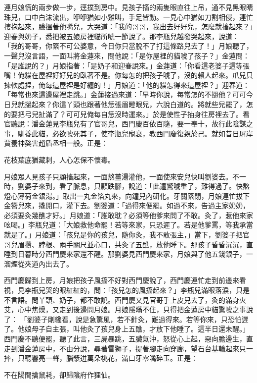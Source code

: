 連月娘慌的兩步做一步，逕撲到房中。見孩子搐的兩隻眼直往上吊，通不見黑眼睛珠兒，口中白沫流出，咿咿猶如小雞叫，手足皆動。一見心中猶如刀割相侵，連忙摟抱起來，臉搵著他嘴兒，大哭道：「我的哥哥，我出去好好兒，怎麼就搐起來？」迎春與奶子，悉把被五娘房裡貓所唬一節說了。那李瓶兒越發哭起來，說道： 「我的哥哥，你緊不可公婆意，今日你只當脫不了打這條路兒去了！」月娘聽了，一聲兒沒言語，一面叫將金蓮來，問他說：「是你屋裡的貓唬了孩子？」金蓮問： 「是誰說的？」月娘指著：「是奶子和迎春說來。」金蓮道：「你看這老婆子這等張嘴！俺貓在屋裡好好兒的臥著不是。你每怎的把孩子唬了，沒的賴人起來。爪兒只揀軟處捏，俺每這屋裡是好纏的！」月娘道：「他的貓怎得來這屋裡？」迎春道：「每常也來這邊屋裡走跳。」金蓮接過來道：「早時你說，每常怎的不撾他？可可今日兒就撾起來？你這丫頭也跟著他恁張眉瞪眼兒，六說白道的。將就些兒罷了，怎的要把弓兒扯滿了？可可兒俺每自恁沒時運來。」於是使性子抽身往房裡去了。看官聽說：潘金蓮見李瓶兒有了官哥兒，西門慶百依百隨，要一奉十，故行此陰謀之事，馴養此貓，必欲唬死其子，使李瓶兒寵衰，教西門慶復親於己。就如昔日屠岸賈養神獒害趙盾丞相一般。正是：

花枝葉底猶藏刺，人心怎保不懷毒。

月娘眾人見孩子只顧搐起來，一面熬薑湯灌他，一面使來安兒快叫劉婆去。不一時，劉婆子來到，看了脈息，只顧跌腳，說道：「此遭驚唬重了，難得過了。快熬燈心薄荷金銀湯。」取出一丸金箔丸來，向鐘兒內研化。牙關緊閉，月娘連忙拔下金簪兒來，撬開口，灌下去。劉婆道：「過得來便罷。如過不來，告過主家奶奶，必須要灸幾醮才好。」月娘道：「誰敢耽？必須等他爹來問了不敢。灸了，惹他來家吆喝。」李瓶兒道：「大娘救他命罷！若等來家，只恐遲了。若是他爹罵，等我承當就是了。」月娘道：「孩兒是你的孩兒，隨你灸，我不敢張主，」當下，劉婆子把官哥兒眉攢、脖根、兩手關尺並心口，共灸了五醮，放他睡下。那孩子昏昏沉沉，直睡到日暮時分西門慶來家還不醒。那劉婆見西門慶來家，月娘與了他五錢銀子，一溜煙從夾道內出去了。

西門慶歸到上房，月娘把孩子風搐不好對西門慶說了，西門慶連忙走到前邊來看視，見李瓶兒哭的眼紅紅的，問：「孩兒怎的風搐起來？」李瓶兒滿眼落淚，只是不言語。問丫頭、奶子，都不敢說。西門慶又見官哥手上皮兒去了，灸的滿身火艾，心中焦燥，又走到後邊問月娘。月娘隱瞞不住，只得把金蓮房中貓驚唬之事說了： 「劉婆子剛纔看，說是急驚風，若不針灸，難過得來。若等你來，只恐怕遲了。他娘母子自主張，叫他灸了孩兒身上五醮，才放下他睡了。這半日還未醒。」西門慶不聽便罷，聽了此言，三屍暴跳，五臟氣沖，怒從心上起，惡向膽邊生，直走到潘金蓮房中，不由分說，尋著雪獅子，提著腳走向穿廊，望石台基輪起來只一摔，只聽響亮一聲，腦漿迸萬朵桃花，滿口牙零噙碎玉。正是：

不在陽間擒鼠耗，卻歸陰府作狸仙。

